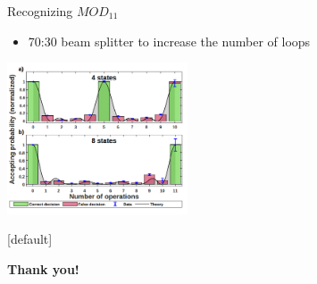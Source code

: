 \documentclass[aspectratio=169,9pt]{beamer}
\begin{document}
\begin{frame}[t]{Recognizing $MOD_{11}$}
  \begin{itemize}
    \item 70:30 beam splitter to increase the number of loops
  \end{itemize}
  \begin{center}
    \includegraphics[width=0.4\textwidth]{4states_8states.png}\\
  \end{center}
\end{frame}




{ %
\makeatletter %
    [default] %
    \def\beamer@entrycode{\vspace*{-\headheight}} %
\makeatother
\begin{frame}
  \begin{center}
    \textbf{\Large Thank you!}
  \end{center}
\end{frame}
}





\end{document}
